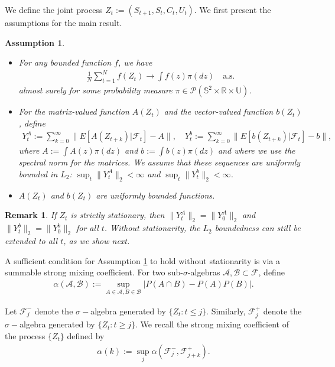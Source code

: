 \documentclass[11pt]{article}
\newtheorem{assumption}{Assumption}
\newtheorem{remark}{Remark}
\def\P{{\mathcal P}}
\begin{document}
We define the joint process $Z_t := (S_{t+1}, S_t, C_t, U_t)$.  We first present the assumptions for the main result.

\begin{assumption}\label{poisson}
\begin{itemize}
\item[i.] For any bounded function $f$, we have
\begin{align*}
\frac{1}{N} \sum_{t=1}^N f(Z_t) \to \int f(z) \pi(dz) \quad \text{a.s.}
\end{align*}
almost surely for some probability measure $\pi \in \P(\mathds{S}^2 \times \mathds{R} \times \mathds{U})$.

\item[ii.] For the matrix-valued function $A(Z_t)$ and the vector-valued function $b(Z_t)$, define
\begin{align}\label{gordin}
Y^A_t := \sum_{k=0}^\infty \| E[A(Z_{t+k})|\mathcal{F}_t] - A \|, \quad
Y^b_t := \sum_{k=0}^\infty \| E[b(Z_{t+k})|\mathcal{F}_t] - b \|,
\end{align}
where $A := \int A(z) \pi(dz)$ and $b := \int b(z) \pi(dz)$ and where we use the spectral norm for the matrices. We assume that these sequences are uniformly bounded in $L_2$: $\sup_t \|Y^A_t\|_2 < \infty$ and $\sup_t \|Y^b_t\|_2 < \infty$.

\item[iii.] $A(Z_t)$ and $b(Z_t)$ are uniformly bounded functions.
\end{itemize}
\end{assumption}

\begin{remark}
If $Z_t$ is strictly stationary, then $\|Y_t^A\|_2 = \|Y_0^A\|_2$ and $\|Y_t^b\|_2 = \|Y_0^b\|_2$ for all $t$. Without stationarity, the $L_2$ boundedness can still be extended to all $t$, as we show next.
\end{remark}

A sufficient condition for Assumption \ref{poisson} to hold without stationarity is via a summable strong mixing coefficient. For two sub-$\sigma$-algebras $\mathcal{A}, \mathcal{B} \subset \mathcal{F}$, define
\begin{align}\label{alpha}
\alpha(\mathcal{A},\mathcal{B}) := \sup_{A \in \mathcal{A}, B \in \mathcal{B}} | P(A \cap B) - P(A) P(B) |.
\end{align}



Let $\mathcal{F}_j^-$ denote the $\sigma-$algebra generated by $\{Z_t: t \leq j\}$. Similarly, $\mathcal{F}_j^+$ denote the  $\sigma-$algebra generated by $\{Z_t: t\geq j\}$. We recall the strong mixing coefficient of the process $\{Z_t\}$ defined by 
\begin{align}\label{mixing}
\alpha(k):=\sup_j \alpha(\mathcal{F}_j^- , \mathcal{F}^+_{j+k}).
\end{align}
\end{document}

